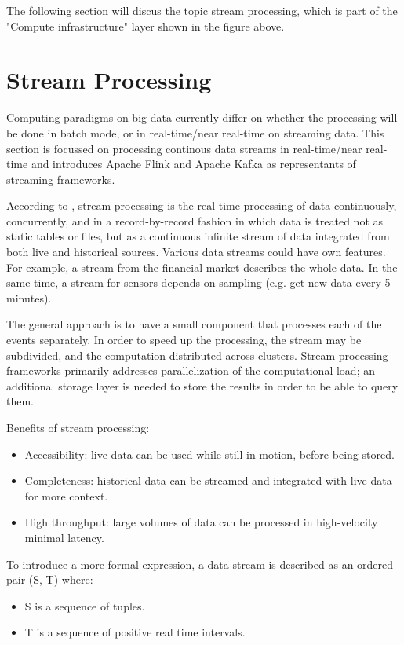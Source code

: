 The following section will discus the topic stream processing, which is part of the
"Compute infrastructure" layer shown in the figure above.

\section{Stream Processing}

Computing paradigms on big data currently differ on whether the processing will be done
in batch mode, or in real-time/near real-time on streaming data. This section is focussed
on processing continous data streams in real-time/near real-time and introduces Apache Flink
and Apache Kafka as representants of streaming frameworks.

According to \cite{Klepp16}, stream processing is the real-time processing of data continuously,
concurrently, and in a record-by-record fashion in which data is treated not as static tables
or files, but as a continuous infinite stream of data integrated from both live and historical
sources. Various data streams could have own features. For example, a stream
from the financial market describes the whole data. In the same time, a stream for sensors
depends on sampling (e.g. get new data every 5 minutes).

The general approach is to have a small component that processes each of the events
separately. In order to speed up the processing, the stream may be subdivided, and the
computation distributed across clusters. Stream processing frameworks primarily addresses
parallelization of the computational load; an additional storage layer is needed to store
the results in order to be able to query them.

Benefits of stream processing:

\begin{itemize}
	\item Accessibility: live data can be used while still in motion, before being stored.
	\item Completeness: historical data can be streamed and integrated with live data for
	more context.
	\item High throughput: large volumes of data can be processed in high-velocity minimal latency.
\end{itemize}

To introduce a more formal expression, a data stream is described as an ordered pair (S, T) where:
\begin{itemize}
	\item S is a sequence of tuples.
	\item T is a sequence of positive real time intervals.
\end{itemize}

